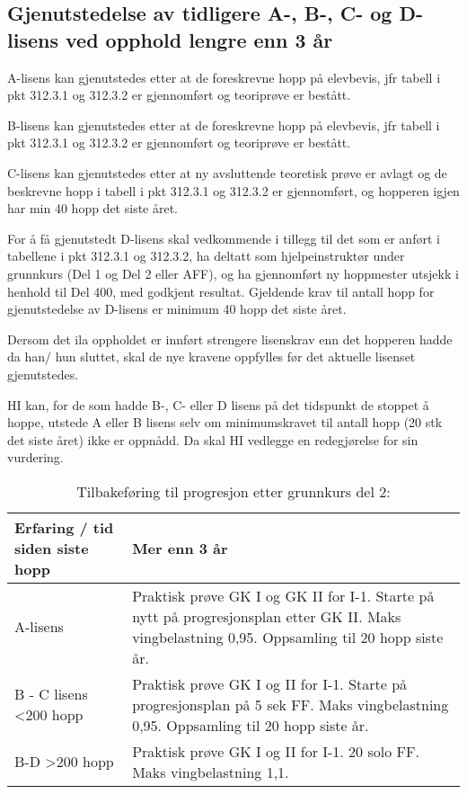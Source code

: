 \subsection{Gjenutstedelse av tidligere A-, B-, C- og D-lisens ved opphold lengre enn 3 år}
A-lisens kan gjenutstedes etter at de foreskrevne hopp på elevbevis, jfr tabell i pkt 312.3.1 og 312.3.2 er gjennomført og teoriprøve er bestått.

B-lisens kan gjenutstedes etter at de foreskrevne hopp på elevbevis, jfr tabell i pkt 312.3.1 og 312.3.2 er gjennomført og teoriprøve er bestått.

C-lisens kan gjenutstedes etter at ny avsluttende teoretisk prøve er avlagt og de beskrevne hopp i tabell i pkt 312.3.1 og 312.3.2 er gjennomført, og hopperen igjen har min 40 hopp det siste året.

For å få gjenutstedt D-lisens skal vedkommende i tillegg til det som er anført i tabellene i pkt 312.3.1 og 312.3.2, ha deltatt som hjelpeinstruktør under grunnkurs (Del 1 og Del 2 eller AFF), og ha gjennomført ny hoppmester utsjekk i henhold til Del 400, med godkjent resultat. Gjeldende krav til antall hopp for gjenutstedelse av D-lisens er minimum 40 hopp det siste året.

Dersom det ila oppholdet er innført strengere lisenskrav enn det hopperen hadde da han/ hun sluttet, skal de nye kravene oppfylles før det aktuelle lisenset gjenutstedes.

HI kan, for de som hadde B-, C- eller D lisens på det tidspunkt de stoppet å hoppe, utstede A eller B lisens selv om minimumskravet til antall hopp (20 stk det siste året) ikke er oppnådd. Da skal HI vedlegge en redegjørelse for sin vurdering.

\begin{table}
	\caption{Tilbakeføring til progresjon etter grunnkurs del 2:}
	\begin{tabular}{ | p{2cm} | p{8cm} | }
		\hline
		Erfaring / tid siden siste hopp & Mer enn 3 år \\
		\hline
		A-lisens & Praktisk prøve GK I og GK II for I-1. Starte på nytt på progresjonsplan etter GK II. Maks vingbelastning 0,95. Oppsamling til 20 hopp siste år. \\
		\hline
		B - C lisens \textless 200 hopp & Praktisk prøve GK I og II for I-1. Starte på progresjonsplan på 5 sek FF. Maks vingbelastning 0,95. Oppsamling til 20 hopp siste år. \\
		\hline
		B-D \textgreater 200 hopp & Praktisk prøve GK I og II for I-1. 20 solo FF. Maks vingbelastning 1,1. \\
		\hline
	\end{tabular}
\end{table}

